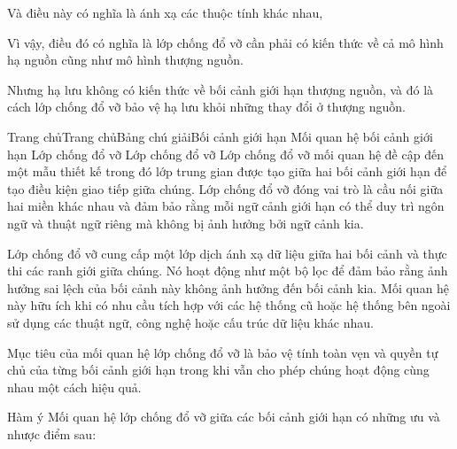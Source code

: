 Và điều này có nghĩa là ánh xạ các thuộc tính khác nhau,

Vì vậy, điều đó có nghĩa là lớp chống đổ vỡ cần phải có kiến thức về cả mô hình hạ nguồn cũng như mô hình thượng nguồn.

Nhưng hạ lưu không có kiến thức về bối cảnh giới hạn thượng nguồn, và đó là cách lớp chống đổ vỡ bảo vệ hạ lưu khỏi những thay đổi ở thượng nguồn.



Trang chủTrang chủBảng chú giảiBối cảnh giới hạn Mối quan hệ bối cảnh giới hạn Lớp chống đổ vỡ
Lớp chống đổ vỡ
Lớp chống đổ vỡ mối quan hệ đề cập đến một mẫu thiết kế trong đó lớp trung gian được tạo giữa hai bối cảnh giới hạn để tạo điều kiện giao tiếp giữa chúng. Lớp chống đổ vỡ đóng vai trò là cầu nối giữa hai miền khác nhau và đảm bảo rằng mỗi ngữ cảnh giới hạn có thể duy trì ngôn ngữ và thuật ngữ riêng mà không bị ảnh hưởng bởi ngữ cảnh kia.

Lớp chống đổ vỡ cung cấp một lớp dịch ánh xạ dữ liệu giữa hai bối cảnh và thực thi các ranh giới giữa chúng. Nó hoạt động như một bộ lọc để đảm bảo rằng ảnh hưởng sai lệch của bối cảnh này không ảnh hưởng đến bối cảnh kia. Mối quan hệ này hữu ích khi có nhu cầu tích hợp với các hệ thống cũ hoặc hệ thống bên ngoài sử dụng các thuật ngữ, công nghệ hoặc cấu trúc dữ liệu khác nhau.

Mục tiêu của mối quan hệ lớp chống đổ vỡ là bảo vệ tính toàn vẹn và quyền tự chủ của từng bối cảnh giới hạn trong khi vẫn cho phép chúng hoạt động cùng nhau một cách hiệu quả.

Hàm ý
Mối quan hệ lớp chống đổ vỡ giữa các bối cảnh giới hạn có những ưu và nhược điểm sau:

